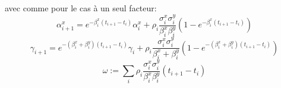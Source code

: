 avec comme pour le cas à un seul facteur:
$$\alpha^x_{i+1} = e^{-\beta^x_i(t_{i+1} - t_i)} \alpha^x_i + \rho_i \frac{\sigma^x_i \sigma^y_i}{\beta^x_i \beta^y_i} (1 - e^{-\beta^x_i(t_{i+1} - t_i)})$$
$$\gamma_{i+1} = e^{- (\beta^x_i+\beta^y_i) (t_{i+1} - t_i)} \gamma_i + \rho_i \frac{\sigma_i^x \sigma_i^y}{\beta_i^x + \beta_i^y} (1 - e^{- (\beta^x_i+\beta^y_i)(t_{i+1} - t_i)})$$
$$\omega := \sum_i \rho_i  \frac{\sigma_i^x \sigma_i^y}{\beta_i^x \beta_i^y} (t_{i+1} - t_i)$$

\iffalse
With $i \leq j$:
\begin{align*}
 \gamma_{ij}^{xy} &:= <K_i^x, K_i^y> \\
  &= <\int_t^{t_i} \sigma_u^x e^{-\int_t^{t_i} \beta^x} dW^x, \int_t^{t_j} \sigma_u^y e^{-\int_t^{t_j} \beta^y} dW^y> \\
  &= e^{-\int_{t_i}^{t_j} \beta_y} \int_t^{t_i} \sigma_u^x \sigma_u^y e^{-\int_t^{t_i} \beta^x + \beta_y} \rho_u du \\
&= e^{-\int_{t_i}^{t_j} \beta_y} \gamma_{ii}
\end{align*}
\fi


